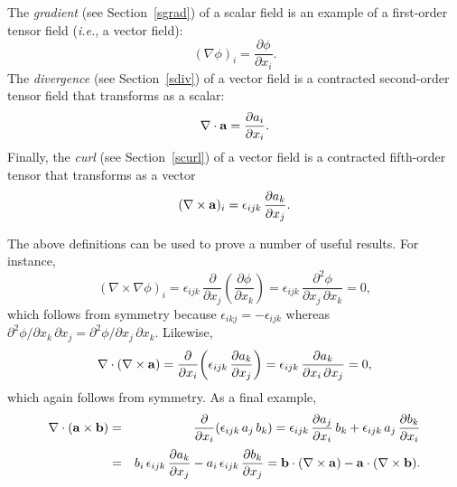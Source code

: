 The {\em gradient}\/ (see Section~\ref{sgrad}) of a scalar field is an example of a first-order tensor field ({\em i.e.}, a vector field): 
\begin{equation}
(\nabla \phi)_i = \frac{\partial \phi}{\partial x_i}.
\end{equation}
The {\em divergence}\/ (see Section~\ref{sdiv}) of a vector field is a contracted second-order tensor field that transforms as a scalar:
\begin{equation}
\nabla\cdot {\bf a} = \frac{\partial a_i}{\partial x_i}.
\end{equation}
Finally, the {\em curl}\/ (see Section~\ref{scurl}) of a vector field is a contracted fifth-order tensor that transforms as a vector
\begin{equation}
(\nabla\times {\bf a})_i = \epsilon_{ijk}\,\frac{\partial a_k}{\partial x_j}.
\end{equation}


The above definitions can be used to prove a number of useful results. 
For instance,
\begin{equation}
(\nabla\times \nabla\phi)_i=\epsilon_{ijk}\,\frac{\partial }{\partial x_j}\!\left(\frac{\partial \phi}{\partial x_k}\right)= \epsilon_{ijk}\,\frac{\partial^2\phi}{\partial x_j\,\partial x_k}=0,
\end{equation}
which follows from symmetry because $\epsilon_{ikj}=-\epsilon_{ijk}$ whereas $\partial^2\phi/\partial x_k\,\partial x_j
= \partial^2\phi/\partial x_j\,\partial x_k$. Likewise,
\begin{equation}
\nabla\cdot( \nabla\times {\bf a}) = \frac{\partial}{\partial x_i}\!\left(\epsilon_{ijk}\,\frac{\partial a_k}{\partial x_j}\right)= \epsilon_{ijk}\,\frac{\partial a_k}{\partial x_i\,\partial x_j} = 0,
\end{equation}
which again follows from symmetry. As a final example,
\begin{eqnarray}
\nabla\cdot ({\bf a}\times {\bf b}) &=& \frac{\partial}{\partial x_i}\!\left(\epsilon_{ijk}\,a_j\,b_k\right)
= \epsilon_{ijk}\,\frac{\partial a_j}{\partial x_i}\,b_k + \epsilon_{ijk}\,a_j\,\frac{\partial b_k}{\partial x_i}\nonumber\\[0.5ex]
&=&b_i\, \epsilon_{ijk}\,\frac{\partial a_k}{\partial x_j}-a_i\,\epsilon_{ijk} \,\frac{\partial b_k}{\partial x_j}
={\bf b}\cdot(\nabla \times {\bf a}) - {\bf a}\cdot(\nabla\times {\bf b}).
\end{eqnarray}

